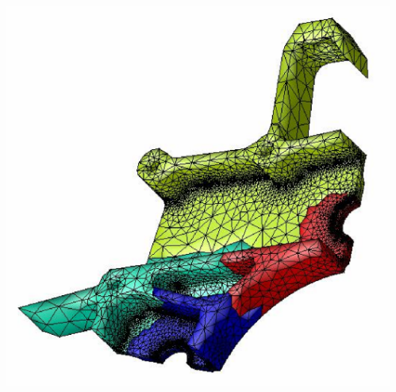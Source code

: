 \documentclass{beamer}
\begin{document}
\begin{frame}
\begin{columns}
\begin{column}{0.25\textwidth}
    \end{column}
    \begin{column}{0.2\textwidth}
      \includegraphics[width=\textwidth]{figs/partitionedMesh.eps}
    \end{column}
  \end{columns}
\end{frame}
\end{document}
